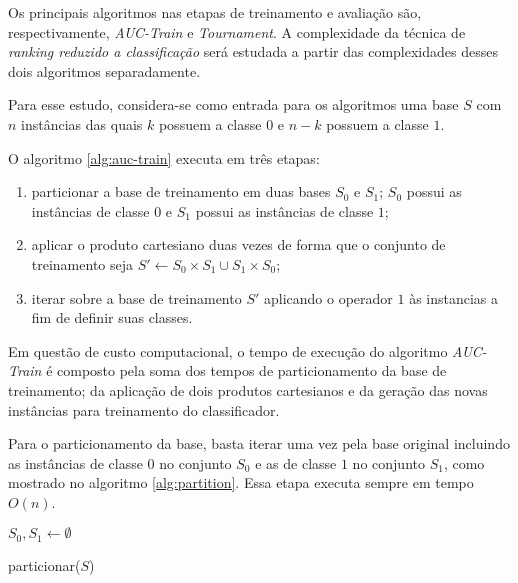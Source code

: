 Os principais algoritmos nas etapas de treinamento e avaliação são, respectivamente, \emph{AUC-Train} e \emph{Tournament}. A complexidade da técnica de \emph{ranking reduzido a classificação} será estudada a partir das complexidades desses dois algoritmos separadamente.

Para esse estudo, considera-se como entrada para os algoritmos uma base $S$ com $n$ instâncias das quais $k$ possuem a classe $0$ e $n - k$ possuem a classe $1$.

O algoritmo \ref{alg:auc-train} executa em três etapas:

\begin{enumerate}
    \item particionar a base de treinamento em duas bases $S_0$ e $S_1$; $S_0$ possui as instâncias de classe $0$ e $S_1$ possui as instâncias de classe $1$;
    \item aplicar o produto cartesiano duas vezes de forma que o conjunto de treinamento seja $S' \gets S_0 \times S_1 \cup S_1 \times S_0$;
    \item iterar sobre a base de treinamento $S'$ aplicando o operador $1$ às instancias a fim de definir suas classes.
\end{enumerate}

Em questão de custo computacional, o tempo de execução do algoritmo \emph{AUC-Train} é composto pela soma dos tempos de particionamento da base de treinamento; da aplicação de dois produtos cartesianos e da geração das novas instâncias para treinamento do classificador.

Para o particionamento da base, basta iterar uma vez pela base original incluindo as instâncias de classe $0$ no conjunto $S_0$ e as de classe $1$ no conjunto $S_1$, como mostrado no algoritmo \ref{alg:partition}. Essa etapa executa sempre em tempo $O(n)$.

\begin{function}

        $S_0, S_1 \gets \emptyset$



    \caption{particionar($S$)}
    \label{alg:partition}
\end{function}


